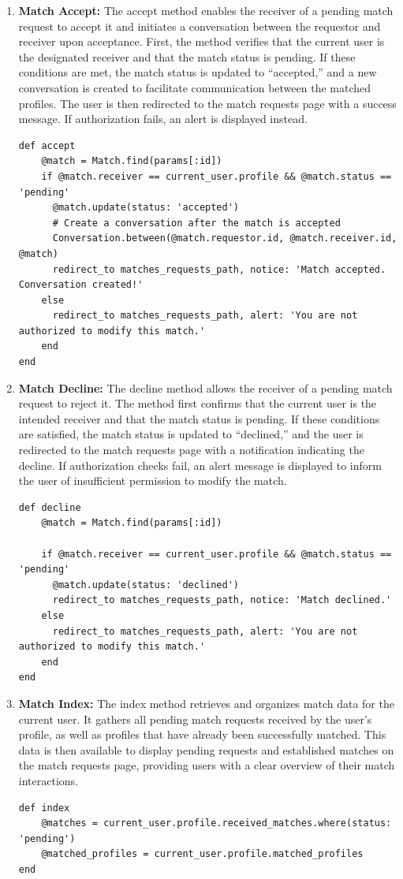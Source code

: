 \begin{enumerate}
    \newpage
    \item \textbf{Match Accept:} 
    The accept method enables the receiver of a pending match request to accept it and initiates a conversation between the requestor and receiver upon acceptance. First, the method verifies that the current user is the designated receiver and that the match status is pending. If these conditions are met, the match status is updated to “accepted,” and a new conversation is created to facilitate communication between the matched profiles. The user is then redirected to the match requests page with a success message. If authorization fails, an alert is displayed instead.
    \begin{lstlisting}
def accept
    @match = Match.find(params[:id])
    if @match.receiver == current_user.profile && @match.status == 'pending'
      @match.update(status: 'accepted')
      # Create a conversation after the match is accepted
      Conversation.between(@match.requestor.id, @match.receiver.id, @match)
      redirect_to matches_requests_path, notice: 'Match accepted. Conversation created!'
    else
      redirect_to matches_requests_path, alert: 'You are not authorized to modify this match.'
    end
end
    \end{lstlisting}

    \newpage
    \item \textbf{Match Decline:} 
    The decline method allows the receiver of a pending match request to reject it. The method first confirms that the current user is the intended receiver and that the match status is pending. If these conditions are satisfied, the match status is updated to “declined,” and the user is redirected to the match requests page with a notification indicating the decline. If authorization checks fail, an alert message is displayed to inform the user of insufficient permission to modify the match.
    \begin{lstlisting}
def decline
    @match = Match.find(params[:id])

    if @match.receiver == current_user.profile && @match.status == 'pending'
      @match.update(status: 'declined')
      redirect_to matches_requests_path, notice: 'Match declined.'
    else
      redirect_to matches_requests_path, alert: 'You are not authorized to modify this match.'
    end
end
    \end{lstlisting}

    \item \textbf{Match Index:} 
    The index method retrieves and organizes match data for the current user. It gathers all pending match requests received by the user’s profile, as well as profiles that have already been successfully matched. This data is then available to display pending requests and established matches on the match requests page, providing users with a clear overview of their match interactions.
    \begin{lstlisting}
def index
    @matches = current_user.profile.received_matches.where(status: 'pending')
    @matched_profiles = current_user.profile.matched_profiles
end
    \end{lstlisting}


\end{enumerate}
